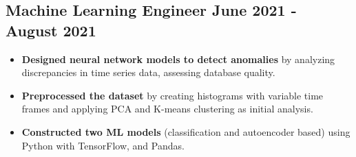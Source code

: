 \documentclass[]{article}
\begin{document}
\vspace{2ex}

\subsection{\large{Machine Learning Engineer} \hfill{\small{June 2021 - August 2021}}}
\vspace{1.5ex}

\begin{itemize}
    \item \textbf{Designed neural network models to detect anomalies} by analyzing discrepancies in time series data, assessing database quality.
    \item \textbf{Preprocessed the dataset} by creating histograms with variable time frames and applying PCA and K-means clustering as initial analysis.
    \item \textbf{Constructed two ML models} (classification and autoencoder based) using Python with TensorFlow, and Pandas.
\end{itemize}
\end{document}
